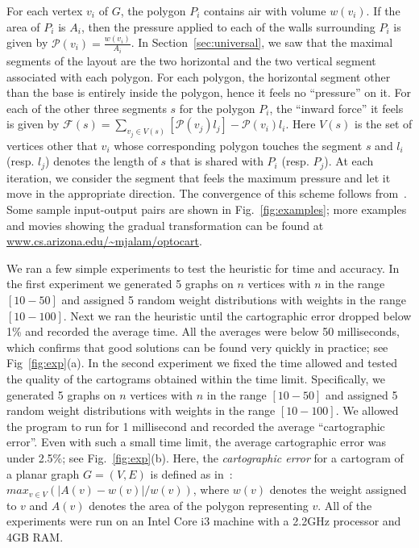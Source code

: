 \documentclass[11pt]{article}
\begin{document}
For each vertex $v_i$ of $G$, the polygon $P_i$ contains air with volume $w(v_i)$. If the area
 of $P_i$ is $A_i$, then the pressure applied to each of the walls surrounding $P_i$ is given by
 $\mathcal{P}(v_i)=\frac{w(v_i)}{A_i}$. In Section~\ref{sec:universal}, we saw that the maximal segments of the layout
 are the two horizontal and the two vertical segment associated with each polygon. For each polygon,
 the horizontal segment other than the base is entirely inside the polygon, hence it feels no
 ``pressure'' on it. For each of the other three segments $s$ for the polygon $P_i$, the ``inward force''
 it feels is given by $\mathcal{F}(s)=\sum_{v_j\in V(s)}[\mathcal{P}(v_j)l_j]-\mathcal{P}(v_i)l_i$.
 Here $V(s)$ is the set of vertices other that $v_i$ whose corresponding polygon touches the segment $s$
 and $l_i$ (resp. $l_j$) denotes the length of $s$ that is shared with $P_i$ (resp. $P_j$).
At each iteration,
 we consider the segment that feels the maximum pressure and let it move in the appropriate direction. The convergence of this scheme
 follows from~\cite{ITK98}. Some sample input-output pairs are shown in Fig.~\ref{fig:examples}; more examples and movies showing the gradual transformation can be found at \url{www.cs.arizona.edu/~mjalam/optocart}.



We ran a few simple experiments to test the heuristic for time and accuracy. In the first experiment we generated 5 graphs on $n$ vertices with $n$ in the range $[10-50]$ and assigned 5 random weight distributions with weights in the range $[10-100]$. Next we ran the heuristic until the cartographic error dropped below 1\% and recorded the average time. All the averages were below 50 milliseconds, which confirms that good solutions can be found very quickly in practice; see Fig~\ref{fig:exp}(a).
In the second experiment we fixed the time allowed and tested the quality of the cartograms obtained within the time limit. Specifically, we generated 5 graphs on $n$ vertices with $n$ in the range $[10-50]$
and assigned 5 random weight distributions with weights in the range $[10-100]$. We allowed the program to run for 1 millisecond and recorded the average ``cartographic error''. Even with such a small time limit, the average cartographic error was under 2.5\%; see Fig.~\ref{fig:exp}(b). Here, the \textit{cartographic error} for a cartogram of a planar graph $G=(V, E)$ is defined as in~\cite{ks07}: $max_{v\in V}(|A(v)-w(v)|/w(v))$, where $w(v)$ denotes the weight assigned to $v$ and $A(v)$ denotes the area of the polygon representing $v$. All of the experiments were run on an Intel Core i3 machine with a 2.2GHz processor and 4GB RAM.
\end{document}

